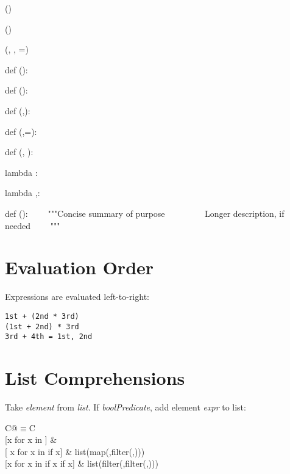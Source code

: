 \documentclass{refcard}
\begin{document}
\begin{ldesc}
	\li[referencing]  \li

	\li[calling]     () \li

	 () \li

	 (, , =) \li

	\li[0-arguments] def (): \li
	                 ~~~~ \li

	\li[1-argument]  def (): \li
	                 ~~~~ \li

	\li[2-arguments] def (,): \li
	                 ~~~~ \li

	 def (,=): \li
	                       ~~~~ \li

	 def (, ): \li
	                         ~~~~ \li

	      lambda :~ \li

	     lambda ,:~ \li

	\li[docstring] def (): \li
	               ~~~~"""Concise summary of purpose \li
	               ~~~~ \li
	               ~~~~Longer description, if needed \li
	               ~~~~""" \li
	               ~~~~ \li
\end{ldesc}

\section{Evaluation Order}

Expressions are evaluated left-to-right:
\begin{verbatim}
1st + (2nd * 3rd)
(1st + 2nd) * 3rd
3rd + 4th = 1st, 2nd
\end{verbatim}

\section{List Comprehensions}

Take \emph{element} from \emph{list}.
If \emph{boolPredicate}, add element \emph{expr} to list:\\
\begin{tabular}{C@{\s$\equiv$\s}C}
	 \\[1ex]
	{[}x for x in ]                   &  \\
	{[} x for x in  if  x]    & list(map(,filter(,))) \\
	{[}x for x in  if  x if  x] & list(filter(,filter(,))) \\
 \\
\end{tabular}
\end{document}
